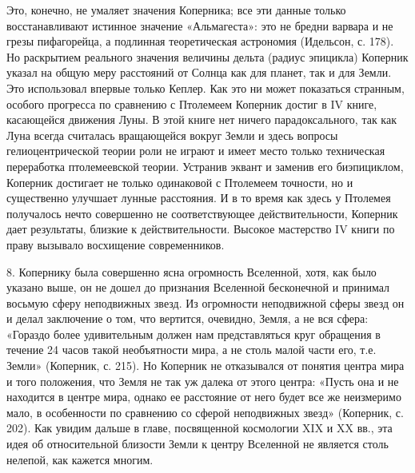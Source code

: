 Это, конечно,  не умаляет  значения Коперника;  все эти  данные только
восстанавливают истинное значение «Альмагеста»:  это не бредни варвара
и  не   грезы  пифагорейца,   а  подлинная   теоретическая  астрономия
(Идельсон, с.  178). Но раскрытием реального  значения величины дельта
(радиус эпицикла) Коперник  указал на общую меру  расстояний от Солнца
как  для планет,  так  и  для Земли.  Это  использовал впервые  только
Кеплер.  Как  это  ни  может показаться  странным,  особого  прогресса
по  сравнению  с Птолемеем  Коперник  достиг  в IV  книге,  касающейся
движения  Луны.  В этой  книге  нет  ничего парадоксального,  так  как
Луна  всегда  считалась  вращающейся  вокруг  Земли  и  здесь  вопросы
гелиоцентрической  теории   роли  не  играют  и   имеет  место  только
техническая  переработка  птолемеевской   теории.  Устранив  эквант  и
заменив  его биэпициклом,  Коперник достигает  не только  одинаковой с
Птолемеем  точности, но  и существенно  улучшает лунные  расстояния. И
в  то  время как  здесь  у  Птолемея  получалось нечто  совершенно  не
соответствующее действительности, Коперник  дает результаты, близкие к
действительности.  Высокое  мастерство  IV  книги  по  праву  вызывало
восхищение современников.

8. Копернику была совершенно ясна огромность Вселенной, хотя, как было
указано  выше,  он  не  дошел до  признания  Вселенной  бесконечной  и
принимал восьмую  сферу неподвижных  звезд. Из  огромности неподвижной
сферы  звезд он  и делал  заключение  о том,  что вертится,  очевидно,
Земля,  а  не  вся  сфера:  «Гораздо  более  удивительным  должен  нам
представляться круг  обращения в  течение 24 часов  такой необъятности
мира, а не  столь малой части его, т.е. Земли»  (Коперник, с. 215). Но
Коперник  не отказывался  от  понятия центра  мира  и того  положения,
что  Земля  не  так  уж  далека  от этого  центра:  «Пусть  она  и  не
находится в  центре мира, однако  ее расстояние  от него будет  все же
неизмеримо  мало, в  особенности  по сравнению  со сферой  неподвижных
звезд»  (Коперник, с.  202). Как  увидим дальше  в главе,  посвященной
космологии XIX  и XX вв., эта  идея об относительной близости  Земли к
центру Вселенной не является столь нелепой, как кажется многим.

